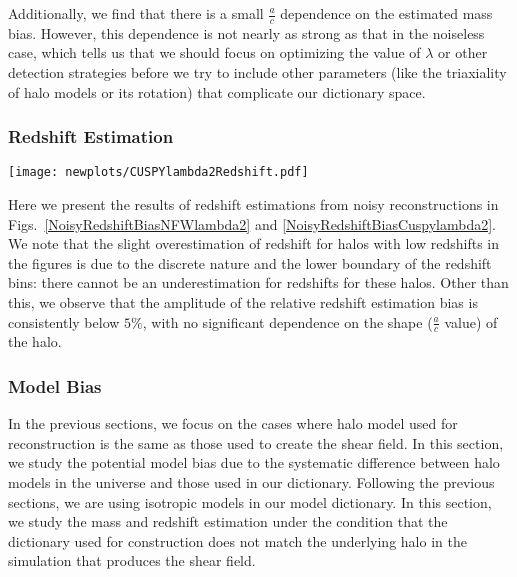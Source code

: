 \documentclass[twocolumn, usenames, dvipsnames]{aastex63}
\begin{document}
Additionally, we find that there is a small $\frac{a}{c}$ dependence on the
estimated mass bias. However, this dependence is not nearly as strong as that
in the noiseless case, which tells us that we should focus on optimizing the
value of $\lambda$ or other detection strategies before we try to include other
parameters (like the triaxiality of halo models or its rotation) that
complicate our dictionary space.

\subsubsection{Redshift Estimation}
\label{sec:oneHalo_noisy_z}

\begin{figure*}
\centering
\texttt{[image: newplots/CUSPYlambda2Redshift.pdf]}
\caption{
    Cuspy NFW halo ($\alpha=1.5$) redshift estimation for $M=10^{14.6},
    10^{14.8}, 10^{15.0},$ and $ 10^{15.2}$, respectively. The mass maps are
    reconstructed with $\lambda=2$\,. The darker grey area indicate a $5\%$
    bias and the lighter grey area indicate a $20\%$ relative mass bias. The
    error bar indicate the standard deviation of reconstructed mass with
    respect to $\frac{a}{c}$ over the range $[0.5,1]$.
    }
    \label{NoisyRedshiftBiasCuspylambda2}
\end{figure*}
Here we present the results of redshift estimations from noisy reconstructions
in Figs.~\ref{NoisyRedshiftBiasNFWlambda2} and
\ref{NoisyRedshiftBiasCuspylambda2}. We note that the slight overestimation of
redshift for halos with low redshifts in the figures is due to the discrete nature and
the lower boundary of the redshift bins: there cannot be an
underestimation for redshifts for these halos. Other than this, we observe that the
amplitude of the relative redshift estimation bias is consistently below $5\%$,
with no significant dependence on the shape ($\frac{a}{c}$ value) of the halo.

\subsubsection{Model Bias}
\label{sec: Model bias}
In the previous sections, we focus on the cases where halo model used for
reconstruction is the same as those used to create the shear field. In this
section, we study the potential model bias due to the systematic difference
between halo models in the universe and those used in our dictionary. Following
the previous sections, we are using isotropic models in our model dictionary.
In this section, we study the mass and redshift estimation under the condition
that the dictionary used for construction does not match the underlying halo in
the simulation that produces the shear field.
\end{document}
